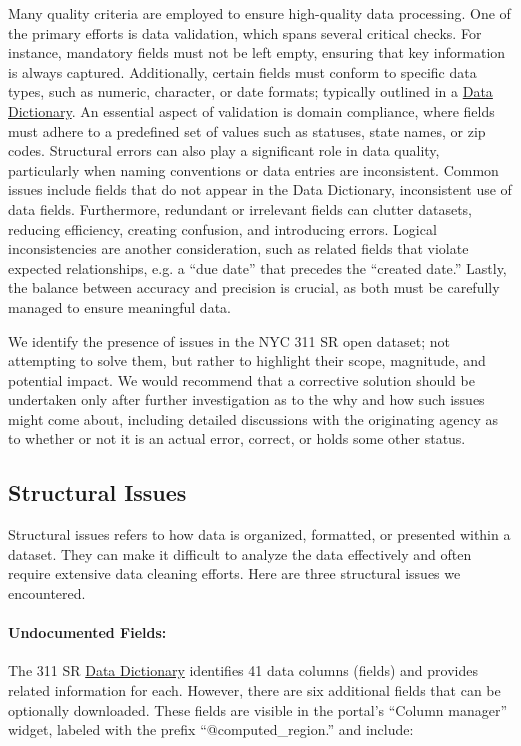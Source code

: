 \documentclass[linenumber]{jdsart}
\begin{document}
Many quality criteria are employed to ensure high\mbox{-}quality data 
processing. One of the primary efforts is data validation, which spans 
several critical checks. For instance, mandatory fields must not be 
left empty, ensuring that key information is always captured. 
Additionally, certain fields must conform to specific data types, 
such as numeric, character, or date formats; typically 
outlined in a \href{https://data.cityofnewyork.us/api/views/erm2-nwe9/files/b372b884-f86a-453b-ba16-1fe06ce9d212?download=true&filename=311_ServiceRequest_2010-Present_DataDictionary_Updated_2023.xlsx}{Data Dictionary}. An 
essential aspect of validation is domain compliance, where 
fields must adhere to a predefined set of 
values such as statuses, state names, or zip codes. Structural 
errors can also play a significant role in data quality, particularly when 
naming conventions or data entries are inconsistent. Common issues 
include fields that do not appear in the Data Dictionary,  
inconsistent use of data fields. Furthermore, redundant 
or irrelevant fields can clutter datasets, reducing efficiency, 
creating confusion, and introducing errors. Logical inconsistencies 
are another consideration, such as related fields that violate expected 
relationships, e.g. a ``due date'' that precedes the ``created date.'' 
Lastly, the balance between accuracy and precision is crucial, as both 
must be carefully managed to ensure meaningful data.


We identify the presence of issues in the NYC 311 SR open dataset;
not attempting to solve them, but rather to highlight their scope, 
magnitude, and potential impact. We would recommend 
that a corrective solution should be undertaken only 
after further investigation as to the why and how such 
issues might come about, including  detailed discussions 
with the originating agency as to whether or not it is an 
actual error, correct,  or holds some other status.


\subsection{Structural Issues}
\label{sec:structural}
Structural issues refers to how data is organized, formatted, 
or presented within a dataset. They can make 
it difficult to analyze the data effectively and often require extensive 
data cleaning efforts. Here are three structural issues we encountered.
 
\paragraph{Undocumented Fields:} The 311 SR 
\href{https://data.cityofnewyork.us/api/views/erm2-nwe9/files/b372b884-f86a-453b-ba16-1fe06ce9d212?download=true&filename=311_ServiceRequest_2010-Present_DataDictionary_Updated_2023.xlsx}{Data Dictionary} 
identifies 41 data columns (fields) and provides related information 
for each. However, there are six additional fields that can be
optionally downloaded. These fields are 
visible in the portal's ``Column manager'' widget, labeled with the prefix 
``@computed\_region.'' and include:
\end{document}
